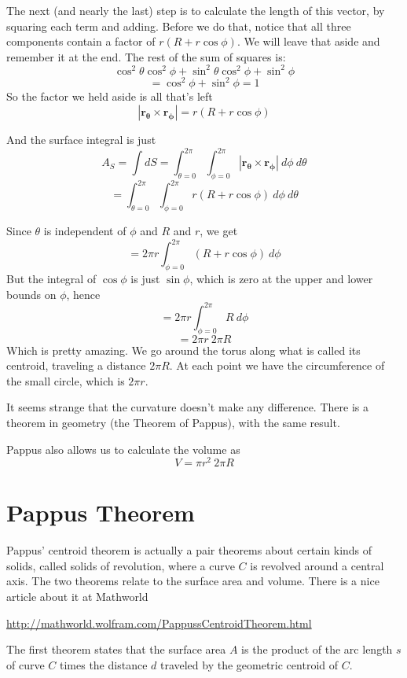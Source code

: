 \documentclass[11pt, oneside]{report}   	%
\begin{document}
The next (and nearly the last) step is to calculate the length of this vector, by squaring each term and adding.  Before we do that, notice that all three components contain a factor of $r (R + r \cos \phi)$.  We will leave that aside and remember it at the end.  The rest of the sum of squares is:
\[ \cos^2 \theta \cos^2 \phi + \sin^2 \theta \cos^2 \phi + \sin^2 \phi   \]
\[ = \cos^2 \phi + \sin^2 \phi  = 1 \]
So the factor we held aside is all that's left
\[ |\mathbf{r_{\theta}} \times \mathbf{r_{\phi}} | = r (R + r \cos \phi) \]

And the surface integral is just
\[ A_S = \int dS = \int_{\theta = 0}^{2 \pi} \int_{\phi = 0}^{2 \pi} |\mathbf{r_{\theta}} \times \mathbf{r_{\phi}}| \ d \phi \ d \theta \]
\[ = \int_{\theta = 0}^{2 \pi} \int_{\phi = 0}^{2 \pi} r (R + r \cos \phi) \ d \phi \ d \theta \]

Since $\theta$ is independent of $\phi$ and $R$ and $r$, we get
\[ = 2 \pi r  \int_{\phi = 0}^{2 \pi} (R + r \cos \phi) \ d \phi  \]
But the integral of $\cos \phi$ is just $\sin \phi$, which is zero at the upper and lower bounds on $\phi$, hence 
\[ = 2 \pi r  \int_{\phi = 0}^{2 \pi} R \ d \phi  \]
\[ = 2 \pi r  \ 2 \pi R \]
Which is pretty amazing.  We go around the torus along what is called its centroid, traveling a distance $ 2 \pi R$.  At each point we have the circumference of the small circle, which is $ 2 \pi r$.  

It seems strange that the curvature doesn't make any difference.  There is a theorem in geometry (the Theorem of Pappus), with the same result.  

Pappus also allows us to calculate the volume as
\[ V = \pi r^2 \ 2 \pi R \]

\chapter{Pappus Theorem}
Pappus' centroid theorem is actually a pair theorems about certain kinds of solids, called solids of revolution, where a curve $C$ is revolved around a central axis.  The two theorems relate to the surface area and volume.  There is a nice article about it at Mathworld
\vspace{2 mm}

\url{http://mathworld.wolfram.com/PappussCentroidTheorem.html}
\vspace{2 mm}

The first theorem states that the surface area $A$ is the product of the arc length $s$ of curve $C$ times the distance $d$ traveled by the geometric centroid of $C$.
\end{document}

